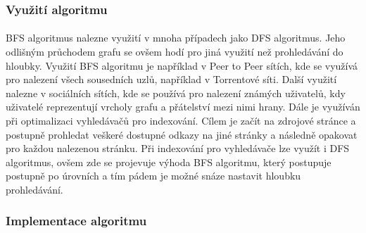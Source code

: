 \documentclass[12pt, titlepage, a4paper]{article}
\begin{document}
\subsubsection{Využití algoritmu}
\paragraph{}
BFS algoritmus nalezne využití v mnoha případech jako DFS algoritmus. Jeho odlišným průchodem grafu se ovšem hodí
pro jiná využití než prohledávání do hloubky. Využití BFS algoritmu je například v Peer to Peer sítích, kde se
využívá pro nalezení všech sousedních uzlů, například v Torrentové síti. Další využití nalezne v sociálních sítích,
kde se používá pro nalezení známých uživatelů, kdy uživatelé reprezentují vrcholy grafu a přátelství mezi nimi hrany.
Dále je využíván při optimalizaci vyhledávačů pro indexování. Cílem je začít na zdrojové stránce a postupně prohledat
veškeré dostupné odkazy na jiné stránky a následně opakovat pro každou nalezenou stránku. Při indexování pro vyhledávače
lze využít i DFS algoritmus, ovšem zde se projevuje výhoda BFS algoritmu, který postupuje postupně po úrovních a tím pádem
je možné snáze nastavit hloubku prohledávání.

\subsubsection{Implementace algoritmu}
\end{document}
